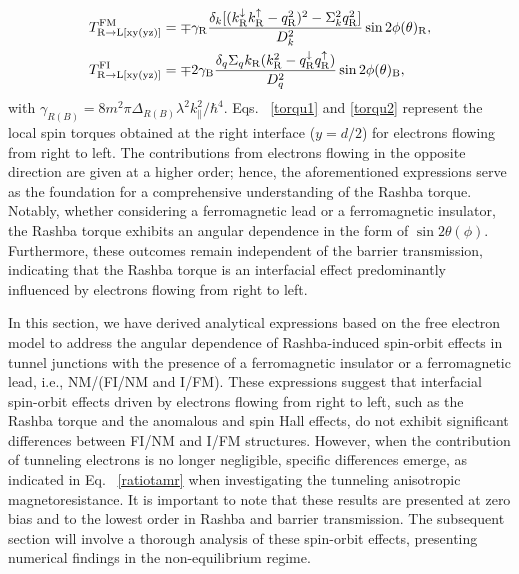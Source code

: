 \documentclass[10pt,pr,twocolumn,showpacs,amssymb,floatfix,superscriptaddress]{revtex4-1}
\newcommand{\tx}{\text}
\newcommand{\dna}{\downarrow}
\newcommand{\para}{\parallel}
\newcommand{\raw}{\rightarrow}
\newcommand{\upa}{\uparrow}
\newcommand{\dlt}{\delta}
\newcommand{\Dlt}{\Delta}
\newcommand{\Sg}{\Sigma}
\begin{document}
\begin{align}
\label{torqu1}
T_{\rm R \raw L [xy(yz)]}^{\tx{FM}} &= \mp \gamma_{\rm R} \frac{ \dlt_k  [(k_{\rm R}^{\dna} k_{\rm R}^{\upa} - q_{\rm R}^2)^2 -\Sg_k^2q_{\rm R}^2]}{D_k^2}\sin 2\phi(\theta)_{\rm R},\\
T_{\rm R \raw L [xy(yz)]}^{\tx{FI}} &= \mp 2\gamma_{\rm B} \frac{  \dlt_q \Sg_q  k_{\rm R}( k_{\rm R}^2 - q_{\rm R}^\dna q_{\rm R}^\upa)}{D_q^2}\sin 2\phi(\theta)_{\rm B} , 
\label{torqu2}
\end{align}
with $\gamma_{R(B)} = 8 m^2 \pi \Dlt_{R(B)}\lambda^2  k_\para^2 / \hbar^4$. Eqs.~ \eqref{torqu1} and \eqref{torqu2} represent the local spin torques obtained at the right interface ($y = d/2$) for electrons flowing from right to left. The contributions from electrons flowing in the opposite direction are given at a higher order; hence, the aforementioned expressions serve as the foundation for a comprehensive understanding of the Rashba torque. Notably, whether considering a ferromagnetic lead or a ferromagnetic insulator, the Rashba torque exhibits an angular dependence in the form of $\sin2\theta(\phi)$. Furthermore, these outcomes remain independent of the barrier transmission, indicating that the Rashba torque is an interfacial effect predominantly influenced by electrons flowing from right to left.

In this section, we have derived analytical expressions based on the free electron model to address the angular dependence of Rashba-induced spin-orbit effects in tunnel junctions with the presence of a ferromagnetic insulator or a ferromagnetic lead, i.e., NM/(FI/NM and I/FM). These expressions suggest that interfacial spin-orbit effects driven by electrons flowing from right to left, such as the Rashba torque and the anomalous and spin Hall effects, do not exhibit significant differences between FI/NM and I/FM structures. However, when the contribution of tunneling electrons is no longer negligible, specific differences emerge, as indicated in Eq.~ \eqref{ratiotamr} when investigating the tunneling anisotropic magnetoresistance. It is important to note that these results are presented at zero bias and to the lowest order in Rashba and barrier transmission. The subsequent section will involve a thorough analysis of these spin-orbit effects, presenting numerical findings in the non-equilibrium regime.


\end{document}
